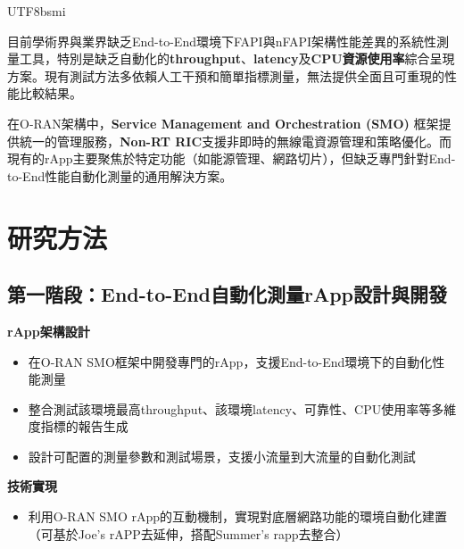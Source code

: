 \documentclass[conference]{IEEEtran}
\begin{document}
\begin{CJK}{UTF8}{bsmi}
{\vspace{1em}

目前學術界與業界缺乏End-to-End環境下FAPI與nFAPI架構性能差異的系統性測量工具，特別是缺乏自動化的\textbf{throughput}、\textbf{latency}及\textbf{CPU資源使用率}綜合呈現方案。現有測試方法多依賴人工干預和簡單指標測量，無法提供全面且可重現的性能比較結果。

\vspace{1em}

在O-RAN架構中，\textbf{Service Management and Orchestration (SMO)} 框架提供統一的管理服務，\textbf{Non-RT RIC}支援非即時的無線電資源管理和策略優化。而現有的rApp主要聚焦於特定功能（如能源管理、網路切片），但缺乏專門針對End-to-End性能自動化測量的通用解決方案。




\section{研究方法}

\subsection{第一階段：End-to-End自動化測量rApp設計與開發}
\textbf{rApp架構設計}
\begin{itemize}
    \item 在O-RAN SMO框架中開發專門的rApp，支援End-to-End環境下的自動化性能測量
    \item 整合測試該環境最高throughput、該環境latency、可靠性、CPU使用率等多維度指標的報告生成
    \item 設計可配置的測量參數和測試場景，支援小流量到大流量的自動化測試
\end{itemize}

\textbf{技術實現}
\begin{itemize}
    \item 利用O-RAN SMO rApp的互動機制，實現對底層網路功能的環境自動化建置（可基於Joe's rAPP去延伸，搭配Summer's rapp去整合）
\end{itemize}

}
\end{CJK}
\end{document}
